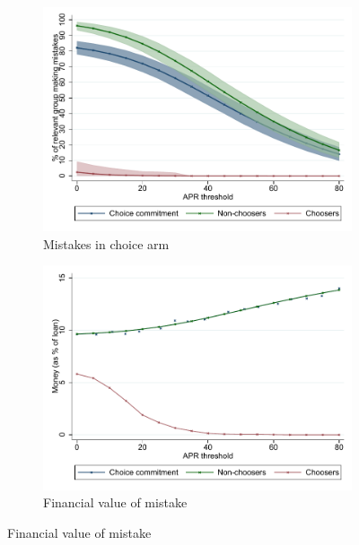 \documentclass[oneside,11pt]{article}
\begin{document}
\begin{figure}[H]
    \caption{Choice of contracts and treatment effects}
    \label{choose_wrong}
    \begin{center}
        \begin{subfigure}{0.45\textwidth}
        \caption{Mistakes in choice arm}
        \centering
        \includegraphics[width=\textwidth]{Figuras/line_cw_apr_te_cf.pdf}
        
    \end{subfigure}
        \begin{subfigure}{0.45\textwidth}
        \caption{Financial value of mistake}
        \centering
        \includegraphics[width=\textwidth]{Figuras/money_cw_apr_te_cf.pdf}

    \bigskip
        

\end{subfigure}
\end{center}
\end{figure}
\end{document}
